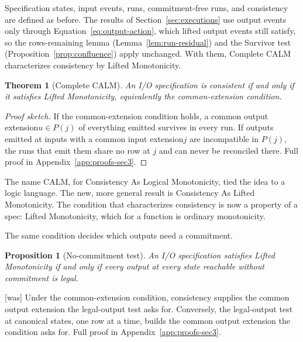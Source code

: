 \documentclass[sigconf]{cidr-2027}
\newtheorem{theorem}{Theorem}
\newtheorem{proposition}{Proposition}
\theoremstyle{remark}
\newcommand{\commitment}{commitment\xspace}
\newcommand{\indesc}{input extension\xspace} %
\newcommand{\outnoun}{output extension\xspace}%
\newcommand{\spectype}[1][]{I/O specification#1\xspace}
\begin{document}
\color{blue!70!black}Specification states, input events, runs, \commitment-free runs, and
consistency are defined as before.  The results of Section~\ref{sec:executions}
use output events only through Equation~\ref{eq:output-action}, which lifted
output events still satisfy, so the rows-remaining lemma
(Lemma~\ref{lem:run-residual}) and the Survivor test
(Proposition~\ref{prop:confluence}) apply unchanged.  With them, Complete CALM
characterizes consistency by Lifted Monotonicity.\color{black}

\begin{theorem}[Complete CALM]
\label{thm:complete-calm}
An \spectype is consistent if and only if it satisfies Lifted
Monotonicity, equivalently the common-extension condition.
\end{theorem}

\begin{proof}[Proof sketch]
If the common-extension condition holds, a common \outnoun $u\in P(j)$
of everything emitted survives in every run.
If outputs emitted at inputs with a common \indesc $j$ are incompatible in
$P(j)$, the runs that emit them share no row at $j$ and can never be
reconciled there.  Full proof in Appendix~\ref{app:proofs-sec3}.
\end{proof}

The name CALM, for Consistency As Logical Monotonicity, tied the idea to a
logic language.  The new, more general result is Consistency As Lifted Monotonicity.
The condition that characterizes consistency is now a
property of a spec: Lifted Monotonicity, which for a function is
ordinary monotonicity.

The same condition decides which outputs need a \commitment.

\begin{proposition}[No-\commitment test]
\label{prop:exposure-boundary}
An \spectype satisfies Lifted Monotonicity if and only
if every output at every state reachable without \commitment is legal.
\end{proposition}



{\footnotesize\color{black!50}\noindent\textsf{[was]} Under the common-extension condition, consistency supplies the common \outnoun
the legal-output test asks for.  Conversely, the legal-output test at canonical
states, one row at a time, builds the common \outnoun the condition
asks for.  Full proof in Appendix~\ref{app:proofs-sec3}.\par}
\end{document}
